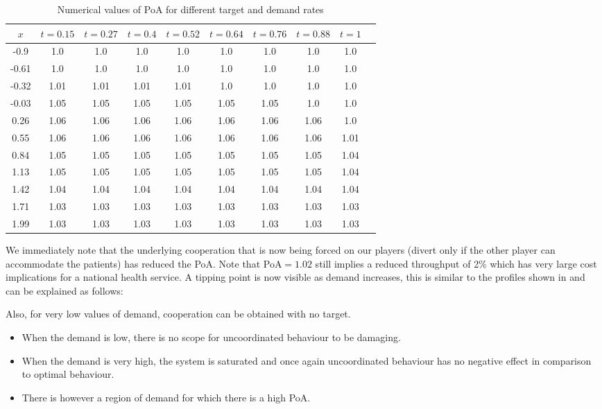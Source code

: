 \documentclass{article}
\begin{document}
\begin{table}[!htbp]
\begin{center}
\begin{tabular}{c|ccccccccc}
\toprule
$x$&$t=0.15$&$t=0.27$&$t=0.4$&$t=0.52$&$t=0.64$&$t=0.76$&$t=0.88$&$t=1$\\
\midrule
-0.9&1.0&1.0&1.0&1.0&1.0&1.0&1.0&1.0\\
-0.61&1.0&1.0&1.0&1.0&1.0&1.0&1.0&1.0\\
-0.32&1.01&1.01&1.01&1.01&1.0&1.0&1.0&1.0\\
-0.03&1.05&1.05&1.05&1.05&1.05&1.05&1.0&1.0\\
0.26&1.06&1.06&1.06&1.06&1.06&1.06&1.06&1.0\\
0.55&1.06&1.06&1.06&1.06&1.06&1.06&1.06&1.01\\
0.84&1.05&1.05&1.05&1.05&1.05&1.05&1.05&1.04\\
1.13&1.05&1.05&1.05&1.05&1.05&1.05&1.05&1.04\\
1.42&1.04&1.04&1.04&1.04&1.04&1.04&1.04&1.04\\
1.71&1.03&1.03&1.03&1.03&1.03&1.03&1.03&1.03\\
1.99&1.03&1.03&1.03&1.03&1.03&1.03&1.03&1.03\\
\bottomrule
\end{tabular}
\end{center}
\caption{Numerical values of PoA for different target and demand rates}\label{tabletargetdemandm2}
\end{table}


We immediately note that the underlying cooperation that is now being forced on our players (divert only if the other player can accommodate the patients) has reduced the PoA.
Note that PoA$=1.02$ still implies a reduced throughput of 2\% which has very large cost implications for a national health service.
A tipping point is now visible as demand increases, this is similar to the profiles shown in \cite{Knight2013} and can be explained as follows:

Also, for very low values of demand, cooperation can be obtained with no target.
\begin{itemize}
    \item When the demand is low, there is no scope for uncoordinated behaviour to be damaging.
    \item When the demand is very high, the system is saturated and once again uncoordinated behaviour has no negative effect in comparison to optimal behaviour.
    \item There is however a region of demand for which there is a high PoA.
\end{itemize}
\end{document}
